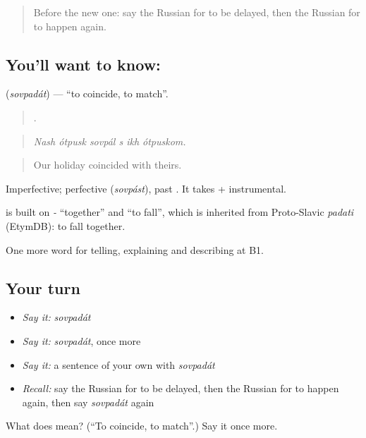 \label{lesson:RU-C275-sovpadat}



\begin{quote}
Before the new one: say the Russian for to be delayed, then the Russian for to happen again.
\end{quote}

\subsection*{You'll want to know: }
\textbf{} (\emph{sovpadát}) — \textquotedblleft{}to coincide, to match\textquotedblright{}.

\begin{quote}
     .
\end{quote}

\begin{quote}
\emph{Nash ótpusk sovpál s ikh ótpuskom.}
\end{quote}

\begin{quote}
Our holiday coincided with theirs.
\end{quote}

Imperfective; perfective \emph{} (\emph{sovpást}), past \emph{}. It takes \emph{} + instrumental.

\begin{cousinweb}
\emph{} is built on \emph{-} \textquotedblleft{}together\textquotedblright{} and \emph{} \textquotedblleft{}to fall\textquotedblright{}, which is inherited from Proto-Slavic \emph{padati} (EtymDB): to fall together.
\end{cousinweb}

\begin{grammarlens}[title={What you've built}]
One more word for telling, explaining and describing at B1.
\end{grammarlens}

\subsection*{Your turn}
\begin{itemize}
\raggedright
  \item \emph{Say it:} \emph{sovpadát}
  \item \emph{Say it:} \emph{sovpadát}, once more
  \item \emph{Say it:} a sentence of your own with \emph{sovpadát}
  \item \emph{Recall:} say the Russian for to be delayed, then the Russian for to happen again, then say \emph{sovpadát} again
\end{itemize}

\begin{tcolorbox}[breakable,colback=teal!4,colframe=teal!35!black,title={Before you move on}]
What does  mean? (\textquotedblleft{}To coincide, to match\textquotedblright{}.) Say it once more.
\end{tcolorbox}
